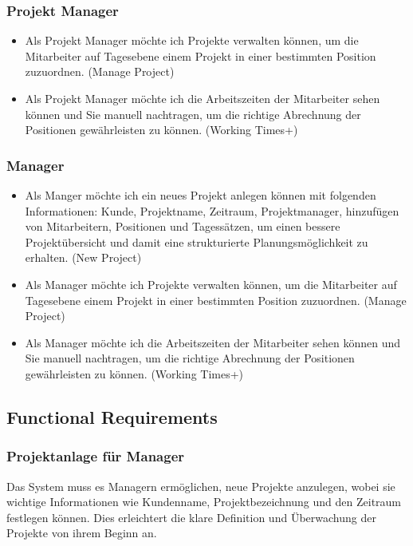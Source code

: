 \documentclass{article}
\begin{document}
        \subsubsection{ Projekt Manager}
        \begin{itemize}
        \item Als Projekt Manager möchte ich Projekte verwalten können, um die Mitarbeiter auf Tagesebene einem Projekt in einer bestimmten Position zuzuordnen. (Manage Project)
        \item Als Projekt Manager möchte ich die Arbeitszeiten der Mitarbeiter sehen können und Sie manuell nachtragen, um die richtige Abrechnung der Positionen gewährleisten zu können. (Working Times+)
        \end{itemize}

        \subsubsection{ Manager}
        \begin{itemize}
        \item Als Manger möchte ich ein neues Projekt anlegen können mit folgenden Informationen: Kunde, Projektname, Zeitraum, Projektmanager, hinzufügen von Mitarbeitern, Positionen und Tagessätzen, um einen bessere Projektübersicht und damit eine strukturierte Planungsmöglichkeit zu erhalten. (New Project)
        \item Als Manager möchte ich Projekte verwalten können, um die Mitarbeiter auf Tagesebene einem Projekt in einer bestimmten Position zuzuordnen. (Manage Project)
        \item Als Manager möchte ich die Arbeitszeiten der Mitarbeiter sehen können und Sie manuell nachtragen, um die richtige Abrechnung der Positionen gewährleisten zu können. (Working Times+)
        \end{itemize}

    \subsection{ Functional Requirements}

        \subsubsection{Projektanlage für Manager}
        Das System muss es Managern ermöglichen, neue Projekte anzulegen, wobei sie wichtige Informationen wie Kundenname, Projektbezeichnung und den Zeitraum festlegen können. Dies erleichtert die klare Definition und Überwachung der Projekte von ihrem Beginn an.
\end{document}
